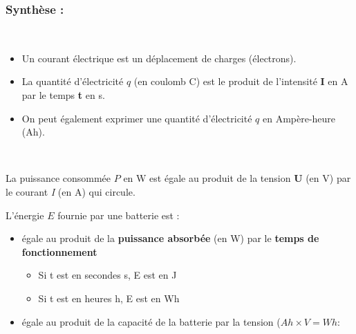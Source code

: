 \documentclass[10pt,fleqn]{article} %
\begin{document}
\subsubsection{Synthèse : }
    \begin{aretenir}~
            \begin{itemize}
                \item Un courant électrique est un déplacement de charges (électrons).
                \item La quantité d'électricité $q$ (en coulomb \si{C}) est le produit de l'intensité \textbf{I} en \si{A} par le temps \textbf{t} en \si{s}.
                \item On peut également exprimer une quantité d'électricité $q$ en Ampère-heure (\si{Ah}).
            \end{itemize}
            \vspace{0.2cm}
        ~\hfill{}\hfill{}\hfill~
    \end{aretenir}

    \begin{aretenir}
        La puissance consommée $P$ en \si{W} est égale au produit de la tension \textbf{U} (en \si{V})  par le courant \textit{I} (en A) qui circule.

        \begin{center}
        \end{center}

    \end{aretenir}

    \begin{aretenir}
        L'énergie $E$ fournie par une batterie est :
        \begin{itemize}
            \item égale au produit de la \textbf{puissance absorbée} (en \si{W}) par le \textbf{temps de fonctionnement}
            \begin{itemize}
                \item Si t est en secondes \si{s}, E est en \si{J}
                \item Si t est en heures \si{h}, E est en \si{Wh}
            \end{itemize}
            \begin{center}
            \end{center}

            \item égale au produit de la capacité de la batterie par la tension ($\si{Ah}\times\si{V} = Wh$:
            \begin{center}
            \end{center}
        \end{itemize}
    \end{aretenir}
\end{document}
